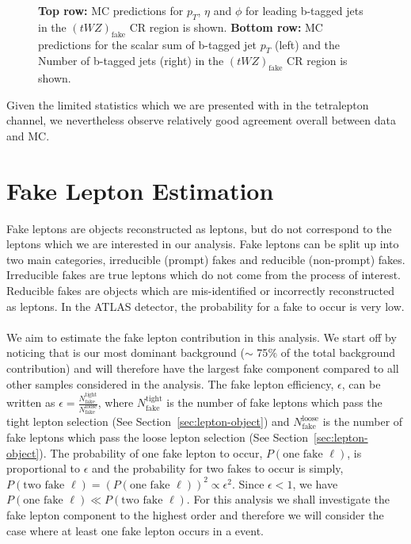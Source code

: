 \begin{figure}[htbp]
    \caption{\textbf{Top row:} MC predictions for $p_{T}$, $\eta$ and $\phi$ for leading b-tagged jets in the $(tWZ)_{\text{fake}}$ CR region  is shown. \textbf{Bottom row:} MC predictions for the scalar sum of b-tagged jet $p_{T}$ (left) and the Number of b-tagged jets (right) in the $(tWZ)_{\text{fake}}$ CR region  is shown.}
  \label{fig:4lep-tWZ-fake-CR-bjetPlots}
\end{figure}


Given the limited statistics which we are presented with in the tetralepton channel, we nevertheless observe relatively good agreement overall between data and MC.

\section{Fake Lepton Estimation}
\label{sec:fakelepest}
Fake leptons are objects reconstructed as leptons, but do not correspond to the leptons which we are interested in our analysis. Fake leptons can be split up into two main categories, irreducible (prompt) fakes and reducible (non-prompt) fakes. Irreducible fakes are true leptons which do not come from the process of interest. Reducible fakes are objects which are mis-identified or incorrectly reconstructed as leptons. In the ATLAS detector, the probability for a fake to occur is very low.\\\\

We aim to estimate the fake lepton contribution in this analysis. We start off by noticing that \ttZ is our most dominant background ($\sim$ 75$\%$ of the total background contribution) and will therefore have the largest fake component compared to all other samples considered in the analysis. The fake lepton efficiency, $\epsilon$, can be written as $\epsilon = \frac{N_{\text{fake}}^{\text{tight}}}{N_{\text{fake}}^{\text{loose}}}$, where $N_{\text{fake}}^{\text{tight}}$ is the number of fake leptons which pass the tight lepton selection (See Section~\ref{sec:lepton-object}) and $N_{\text{fake}}^{\text{loose}}$ is the number of fake leptons which pass the loose lepton selection (See Section~\ref{sec:lepton-object}). The probability of one fake lepton to occur, $P(\text{one fake }\ell)$, is proportional to $\epsilon$ and the probability for two fakes to occur is simply, $P(\text{two fake }\ell) = (P(\text{one fake }\ell))^{2} \propto \epsilon^{2}$. Since $\epsilon < 1$, we have $P(\text{one fake }\ell) \ll P(\text{two fake }\ell)$. For this analysis we shall investigate the fake lepton component to the highest order and therefore we will consider the case where at least one fake lepton occurs in a \ttZ event.\\\\

